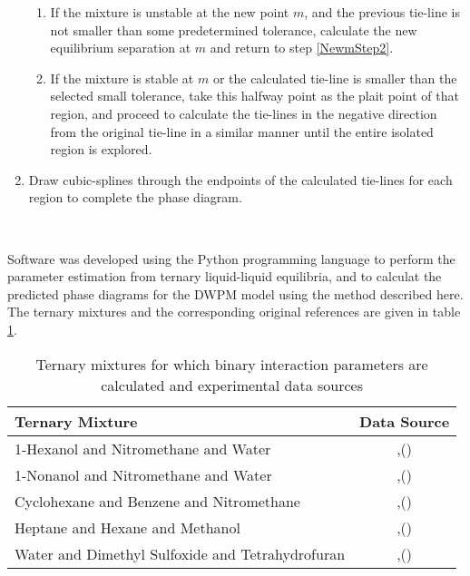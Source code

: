 \begin{enumerate}
\begin{enumerate}
	\item If the mixture is unstable at the new point $m$, and the previous tie-line is not smaller than some predetermined tolerance, calculate the new equilibrium separation at $m$ and return to step \ref{NewmStep2}.\
	\item If the mixture is stable at $m$ or the calculated tie-line is smaller than the selected small tolerance, take this halfway point as the plait point of that region, and proceed to calculate the tie-lines in the negative direction from the original tie-line in a similar manner until the entire isolated region is explored.\
\end{enumerate}
\item Draw cubic-splines through the endpoints of the calculated tie-lines for each region to complete the phase diagram.\
\end{enumerate}\

Software was developed using the Python programming language to perform the parameter estimation from ternary liquid-liquid equilibria, and to calculat the predicted phase diagrams for the DWPM model using the method described here. The ternary mixtures and the corresponding original references are given in table \ref{TernarySystemsandReferences}.\

\begin{table}
\begin{tabularx}{\textwidth}{Xc}
\hline
\textbf{Ternary Mixture}&\textbf{Data Source}\\
\hline
\hline
1-Hexanol and Nitromethane and Water&\citeauthor{SazonovMarkuzinFilippov},(\citeyear{SazonovMarkuzinFilippov}) \cite{SazonovMarkuzinFilippov} \\
1-Nonanol and Nitromethane and Water&\citeauthor{SazonovChernysheva},(\citeyear{SazonovChernysheva}) \cite{SazonovChernysheva} \\
Cyclohexane and Benzene and Nitromethane& \citeauthor{WeckHunt},(\citeyear{WeckHunt}) \cite{WeckHunt} \\
Heptane and Hexane and Methanol& \citeauthor{Wittrig},(\citeyear{Wittrig}) \cite{Wittrig} \\
Water and Dimethyl Sulfoxide and Tetrahydrofuran & \citeauthor{FoucaultDurandCamachoGoffic},(\citeyear{FoucaultDurandCamachoGoffic}) \cite{FoucaultDurandCamachoGoffic}\\
\hline
\end{tabularx}\\
\caption{Ternary mixtures for which binary interaction parameters are calculated and experimental data sources} \label{TernarySystemsandReferences}
\end{table}\
